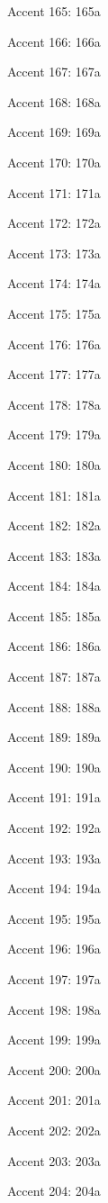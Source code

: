 Accent 165: \accent165a

Accent 166: \accent166a

Accent 167: \accent167a

Accent 168: \accent168a

Accent 169: \accent169a

Accent 170: \accent170a

Accent 171: \accent171a

Accent 172: \accent172a

Accent 173: \accent173a

Accent 174: \accent174a

Accent 175: \accent175a

Accent 176: \accent176a

Accent 177: \accent177a

Accent 178: \accent178a

Accent 179: \accent179a

Accent 180: \accent180a

Accent 181: \accent181a

Accent 182: \accent182a

Accent 183: \accent183a

Accent 184: \accent184a

Accent 185: \accent185a

Accent 186: \accent186a

Accent 187: \accent187a

Accent 188: \accent188a

Accent 189: \accent189a

Accent 190: \accent190a

Accent 191: \accent191a

Accent 192: \accent192a

Accent 193: \accent193a

Accent 194: \accent194a

Accent 195: \accent195a

Accent 196: \accent196a

Accent 197: \accent197a

Accent 198: \accent198a

Accent 199: \accent199a

Accent 200: \accent200a

Accent 201: \accent201a

Accent 202: \accent202a

Accent 203: \accent203a

Accent 204: \accent204a

